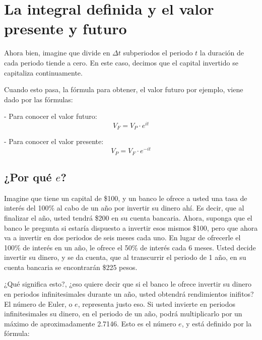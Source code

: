 \documentclass{article}
\begin{document}
                

                
        \section{La integral definida y el valor presente y futuro}

            Ahora bien, imagine que divide en $\Delta t$ subperiodos el periodo $t$ la duración de cada periodo tiende a cero. En este caso, decimos que el capital invertido se capitaliza continuamente.

            Cuando esto pasa, la fórmula para obtener, el valor futuro por ejemplo, viene dado por las fórmulas:

            - Para conocer el valor futuro:
            \begin{equation}
                V_F = V_P \cdot e^{it}
            \end{equation}
            
            - Para conocer el valor presente:
            \begin{equation}
                V_P = V_F \cdot e^{-it}
            \end{equation}

            \subsection{¿Por qué $e$?}

            Imagine que tiene un capital de \$100, y un banco le ofrece a usted una tasa de interés del 100\% al cabo de un año por invertir su dinero ahí. Es decir, que al finalizar el año, usted tendrá \$200 en su cuenta bancaria. Ahora, suponga que el banco le pregunta si estaría dispuesto a invertir esos mismos \$100, pero que ahora va a invertir en dos periodos de seis meses cada uno. En lugar de ofrecerle el 100\% de interés en un año, le ofrece el 50\% de interés cada 6 meses. Usted decide invertir su dinero, y se da cuenta, que al transcurrir el periodo de 1 año, en su cuenta bancaria se encontrarán \$225 pesos.

            ¿Qué significa esto?, ¿eso quiere decir que si el banco le ofrece invertir su dinero en periodos infinitesimales durante un año, usted obtendrá rendimientos inifitos? El número de Euler, o $e$, representa justo eso. Si usted invierte en periodos infinitesimales su dinero, en el periodo de un año, podrá multiplicarlo por un máximo de aproximadamente 2.7146. Esto es el número $e$, y está definido por la fórmula:
\end{document}

